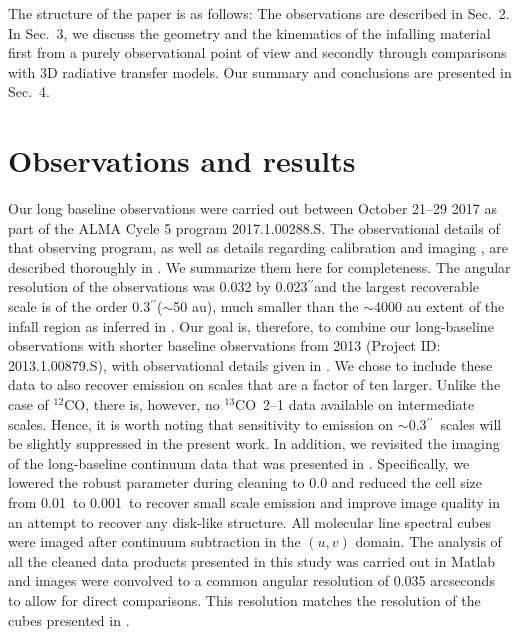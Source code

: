 \documentclass{aa}
\newcommand{\about}{$\sim$}                       %
\newcommand{\tolvco}{$^{12}$CO\xspace}
\newcommand{\trettenco}{$^{13}$CO\xspace}
\newcommand{\asec}{$^{\prime \prime}$}
\begin{document}
The structure of the paper is as follows: The observations are described in Sec.\ 2. In Sec.\ 3, we discuss the geometry and the kinematics of the infalling material first from a purely observational point of view and secondly through comparisons with 3D radiative transfer models. Our summary and conclusions are presented in Sec.\ 4. 

\section{Observations and results}
\label{sec:observations}
%
Our long baseline observations were carried out between October 21--29 2017 as part of the ALMA Cycle 5 program 2017.1.00288.S. The observational details of that observing program, as well as details regarding calibration and imaging \citep[carried out in CASA;][]{McMullin:2007nr}, are described thoroughly in \citet{Bjerkeli:2019ip}.
We summarize them here for completeness. The angular resolution of the observations was 0.032 by 0.023\asec and the largest recoverable scale is of the order 0.3\asec (\about 50 au), much smaller than the \about 4000 au extent of the infall region as inferred in \citet{Evans:2015qp}. Our goal is, therefore, to combine our long-baseline observations with shorter baseline observations from 2013 (Project ID: 2013.1.00879.S), with observational details given in \citet{Yen:2015vf}. We chose to include these data to also recover emission on scales that are a factor of ten larger. 
Unlike the case of \tolvco, there is, however, no \trettenco\ 2--1 data available on intermediate scales. Hence, it is worth noting that sensitivity to emission on \about0.3\asec\ scales will be slightly suppressed in the present work. In addition, we revisited the imaging of the long-baseline continuum data that was presented in \cite{Bjerkeli:2019ip}. Specifically, we lowered the robust parameter during cleaning to 0.0 and reduced the cell size from 0.01\arcsec\ to 0.001\arcsec\ to recover small scale emission and improve image quality in an attempt to recover any disk-like structure. All molecular line spectral cubes were imaged after continuum subtraction in the $(u,v)$ domain.  The analysis of all the cleaned data products presented in this study was carried out in Matlab and images were convolved to a common angular resolution of 0.035 arcseconds to allow for direct comparisons. This resolution matches the resolution of the cubes presented in \citet{Bjerkeli:2019ip}.
\end{document}
